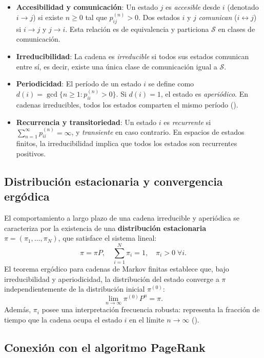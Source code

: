\documentclass[
  spanish,
  us-letterpaper,
]{scrreprt}
\providecommand{\tightlist}{%
  \setlength{\itemsep}{0pt}\setlength{\parskip}{0pt}}
\numberwithin{equation}{section}
\begin{document}
\begin{itemize}
\tightlist
\item
  \textbf{Accesibilidad y comunicación}: Un estado \(j\) es
  \emph{accesible} desde \(i\) (denotado \(i \to j\)) si existe
  \(n \geq 0\) tal que \(p_{ij}^{(n)} > 0\). Dos estados \(i\) y \(j\)
  \emph{comunican} (\(i \leftrightarrow j\)) si \(i \to j\) y
  \(j \to i\). Esta relación es de equivalencia y particiona
  \(\mathcal{S}\) en clases de comunicación.
\item
  \textbf{Irreducibilidad}: La cadena es \emph{irreducible} si todos sus
  estados comunican entre sí, es decir, existe una única clase de
  comunicación igual a \(\mathcal{S}\).
\item
  \textbf{Periodicidad}: El período de un estado \(i\) se define como
  \(d(i) = \gcd\{n \geq 1 : p_{ii}^{(n)} > 0\}\). Si \(d(i) = 1\), el
  estado es \emph{aperiódico}. En cadenas irreducibles, todos los
  estados comparten el mismo período
  ().
\item
  \textbf{Recurrencia y transitoriedad}: Un estado \(i\) es
  \emph{recurrente} si \(\sum_{n=1}^\infty p_{ii}^{(n)} = \infty\), y
  \emph{transiente} en caso contrario. En espacios de estados finitos,
  la irreducibilidad implica que todos los estados son recurrentes
  positivos.
\end{itemize}

\subsection{Distribución estacionaria y convergencia
ergódica}\label{sec-ergodicidad}

El comportamiento a largo plazo de una cadena irreducible y aperiódica
se caracteriza por la existencia de una \textbf{distribución
estacionaria} \(\pi = (\pi_1, \dots, \pi_N)\), que satisface el sistema
lineal: \[
\pi = \pi P, \quad \sum_{i=1}^{N} \pi_i = 1, \quad \pi_i > 0 \; \forall i.
\] El teorema ergódico para cadenas de Markov finitas establece que,
bajo irreducibilidad y aperiodicidad, la distribución del estado
converge a \(\pi\) independientemente de la distribución inicial
\(\pi^{(0)}\): \[
\lim_{n \to \infty} \pi^{(0)} P^n = \pi.
\] Además, \(\pi_i\) posee una interpretación frecuencia robusta:
representa la fracción de tiempo que la cadena ocupa el estado \(i\) en
el límite \(n \to \infty\)
().

\subsection{Conexión con el algoritmo
PageRank}\label{conexiuxf3n-con-el-algoritmo-pagerank}
\end{document}
